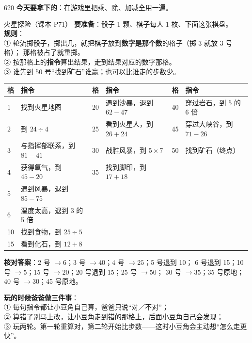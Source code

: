 \begin{lesson}{6}{20}
\textbf{今天要拿下的}：在游戏里把乘、除、加减全用一遍。

\begin{playbox}{火星探险（课本 P71）}
\textbf{要准备}：骰子 1 颗、棋子每人 1 枚、下面这张棋盘。\\
\textbf{规则}：\\
① 轮流掷骰子，掷出几，就把棋子放到\textbf{数字是那个数}的格子（掷 3 就放 3 号格）；
那格被占了就重掷。\\
② 按那格上的\textbf{指令}算出结果，走到结果对应的数字那格。\\
③ 谁先到 50 号“找到矿石”谁赢；也可以比谁走的步数少。
\end{playbox}

\begin{center}
\small
\begin{tabularx}{\linewidth}{@{}p{0.9cm}Xp{0.9cm}Xp{0.9cm}X@{}}
\toprule
\textbf{格} & \textbf{指令} & \textbf{格} & \textbf{指令} & \textbf{格} & \textbf{指令} \\
\midrule
1 & 找到火星地图 & 20 & 遇到沙暴，退到 $62-47$ & 40 & 穿过岩石，到 5 的 6 倍 \\
2 & 到 $24\div4$ & 25 & 看到火星人，到 $26+24$ & 45 & 穿过大峡谷，到 $71-26$ \\
3 & 与指挥部联系，到 $81-41$ & 30 & 战胜风暴，到 $5\times7$ & 50 & 找到矿石（终点）\\
4 & 获得氧气，到 $45-20$ & 35 & 找到脚印，到 $17+18$ & & \\
5 & 遇到风暴，退到 $85-75$ & & & & \\
6 & 温度太高，退到 3 的 5 倍 & & & & \\
10 & 找到食物，到 $25\div5$ & & & & \\
15 & 看到化石，到 $12+8$ & & & & \\
\bottomrule
\end{tabularx}
\end{center}

\noindent\textbf{核对答案}：2 号 $\to6$；3 号 $\to40$；4 号 $\to25$；5 号退到 10；
6 号退到 15；10 号 $\to5$；15 号 $\to20$；20 号退到 15；25 号 $\to50$；
30 号 $\to35$；35 号原地；40 号 $\to30$；45 号原地。

\begin{tipbox}
\textbf{玩的时候爸爸做三件事}：\\
① 每句指令都让小豆角自己算，爸爸只说“对／不对”；\\
② 算错了别马上改，让小豆角走到错的那格上，后面小豆角自己会发现；\\
③ 玩两轮。第一轮重算对，第二轮开始比步数——这时小豆角会主动想“怎么走更快”。
\end{tipbox}
\end{lesson}

